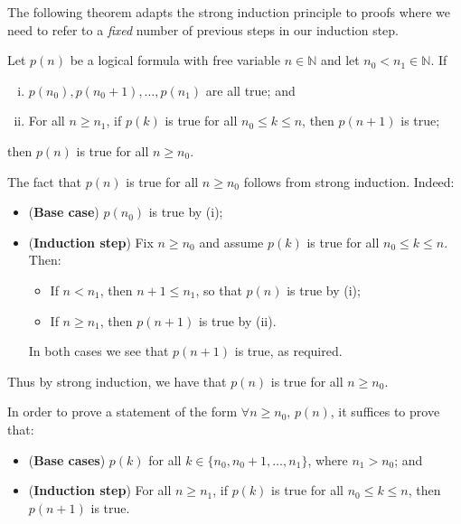 The following theorem adapts the strong induction principle to proofs where we need to refer to a \textit{fixed} number of previous steps in our induction step.

\begin{theorem}
\label{thmSIPMultipleBaseCases}
Let $p(n)$ be a logical formula with free variable $n \in \mathbb{N}$ and let $n_0 < n_1 \in \mathbb{N}$. If
\begin{enumerate}[(i)] \vspace{5pt} 
\item $p(n_0), p(n_0+1), \dots, p(n_1)$ are all true; and
\item For all $n \ge n_1$, if $p(k)$ is true for all $n_0 \le k \le n$, then $p(n+1)$ is true;
\end{enumerate}
\vspace{5pt}
then $p(n)$ is true for all $n \ge n_0$.
\end{theorem}

\begin{cproof}
The fact that $p(n)$ is true for all $n \ge n_0$ follows from strong induction. Indeed:
\begin{itemize}
\item (\textbf{Base case}) $p(n_0)$ is true by (i);
\item (\textbf{Induction step}) Fix $n \ge n_0$ and assume $p(k)$ is true for all $n_0 \le k \le n$. Then:
\begin{itemize}
\item If $n < n_1$, then $n+1 \le n_1$, so that $p(n)$ is true by (i);
\item If $n \ge n_1$, then $p(n+1)$ is true by (ii).
\end{itemize}
In both cases we see that $p(n+1)$ is true, as required.
\end{itemize}
Thus by strong induction, we have that $p(n)$ is true for all $n \ge n_0$.
\end{cproof}

\begin{strategy}
In order to prove a statement of the form $\forall n \ge n_0,\, p(n)$, it suffices to prove that:
\begin{itemize}
\item (\textbf{Base cases}) $p(k)$ for all $k \in \{ n_0, n_0+1, \dots, n_1 \}$, where $n_1 > n_0$; and
\item (\textbf{Induction step}) For all $n \ge n_1$, if $p(k)$ is true for all $n_0 \le k \le n$, then $p(n+1)$ is true.
\end{itemize}
\end{strategy}

